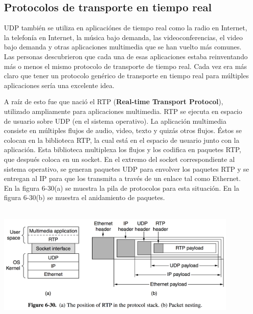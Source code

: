 \documentclass[10pt,a4paper]{report}
\begin{document}
\subsection{Protocolos de transporte en tiempo real}

	\par UDP también se utiliza en aplicaciónes de tiempo real como la radio en Internet, la telefonía en Internet, la música bajo demanda, las videoconferencias, el video bajo demanda y otras aplicaciones multimedia que se han vuelto más comunes. Las personas descubrieron que cada una de esas aplicaciones estaba reinventando más o menos el mismo protocolo de transporte de tiempo real. Cada vez era más claro que tener un protocolo genérico de transporte en tiempo real para múltiples aplicaciones sería una excelente idea.

	\par A raíz de esto fue que nació el RTP (\textbf{Real-time Transport Protocol}), utilizado ampliamente para aplicaciones multimedia. RTP se ejecuta en espacio de usuario sobre UDP (en el sistema operativo). La aplicación multimedia consiste en múltiples flujos de audio, video, texto y quizás otros flujos. Éstos se colocan en la biblioteca RTP, la cual está en el espacio de usuario junto con la aplicación. Esta biblioteca multiplexa los flujos y los codifica en paquetes RTP, que después coloca en un socket. En el extremo del socket correspondiente al sistema operativo, se generan paquetes UDP para envolver los paquetes RTP y se entregan al IP para que los transmita a través de un enlace tal como Ethernet. En la figura 6-30(a) se muestra la pila de protocolos para esta situación. En la figura 6-30(b) se muestra el anidamiento de paquetes.
	
	\begin{center}
		\includegraphics[width=12cm, height=6cm]{./imagenes/tiemporeal.png} 
	\end{center}
\end{document}
